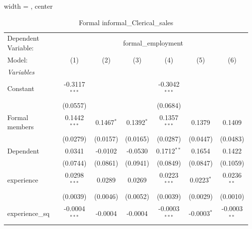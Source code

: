 \begin{table}[htbp]
   \caption{Formal informal\_Clerical\_sales}
   \centering
   \begin{adjustbox}{width = \textwidth, center}
      \begin{tabular}{lcccccc}
         \tabularnewline \midrule \midrule
         Dependent Variable: & \multicolumn{6}{c}{formal\_employment}\\
         Model:                    & (1)                     & (2)                     & (3)                    & (4)                     & (5)                     & (6)\\  
         \midrule
         \emph{Variables}\\
         Constant                  & -0.3117$^{***}$         &                         &                        & -0.3042$^{***}$         &                         &   \\   
                                   & (0.0557)                &                         &                        & (0.0684)                &                         &   \\   
         Formal members            & 0.1442$^{***}$          & 0.1467$^{*}$            & 0.1392$^{*}$           & 0.1357$^{***}$          & 0.1379                  & 0.1409\\   
                                   & (0.0279)                & (0.0157)                & (0.0165)               & (0.0287)                & (0.0447)                & (0.0483)\\   
         Dependent                 & 0.0341                  & -0.0102                 & -0.0530                & 0.1712$^{**}$           & 0.1654                  & 0.1422\\   
                                   & (0.0744)                & (0.0861)                & (0.0941)               & (0.0849)                & (0.0847)                & (0.1059)\\   
         experience                & 0.0298$^{***}$          & 0.0289                  & 0.0269                 & 0.0223$^{***}$          & 0.0223$^{*}$            & 0.0236$^{**}$\\   
                                   & (0.0039)                & (0.0046)                & (0.0052)               & (0.0039)                & (0.0029)                & (0.0010)\\   
         experience\_sq            & -0.0004$^{***}$         & -0.0004                 & -0.0004                & -0.0003$^{***}$         & -0.0003$^{*}$           & -0.0003$^{**}$\\   

\end{tabular}
\end{adjustbox}
\end{table}
